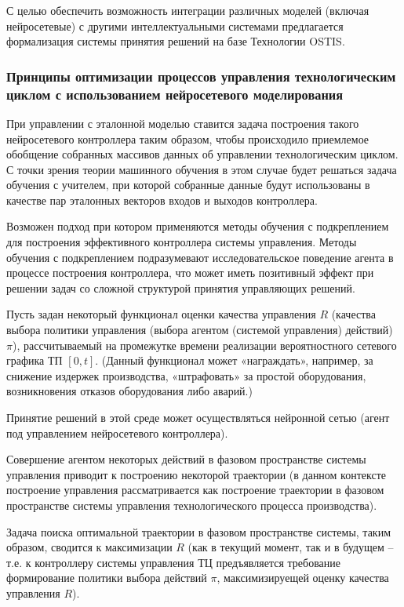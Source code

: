С целью обеспечить возможность интеграции различных моделей (включая нейросетевые) с другими интеллектуальными системами предлагается формализация системы принятия решений на базе Технологии OSTIS.










\subsubsection{Принципы оптимизации процессов управления технологическим циклом с использованием нейросетевого моделирования}

При управлении с эталонной моделью ставится задача построения такого нейросетевого контроллера таким образом, чтобы происходило приемлемое обобщение собранных массивов данных об управлении технологическим циклом. С точки зрения теории машинного обучения в этом случае будет решаться задача обучения с учителем, при которой собранные данные будут использованы в качестве пар эталонных векторов входов и выходов контроллера.

Возможен подход при котором применяются методы обучения с подкреплением для построения эффективного контроллера системы управления. Методы обучения с подкреплением подразумевают исследовательское поведение агента в процессе построения контроллера, что может иметь позитивный эффект при решении задач со сложной структурой принятия управляющих решений.

Пусть задан некоторый функционал оценки качества управления $R$ (качества выбора политики управления (выбора агентом (системой управления) действий) $\pi$), рассчитываемый на промежутке времени реализации вероятностного сетевого графика ТП $[0,t]$. (Данный функционал может «награждать», например, за снижение издержек производства, «штрафовать» за простой оборудования, возникновения отказов оборудования либо аварий.)

Принятие решений в этой среде может осуществляться нейронной сетью (агент под управлением нейросетевого контроллера).

Совершение агентом некоторых действий в фазовом пространстве системы управления приводит к построению некоторой траектории (в данном контексте построение управления рассматривается как построение траектории в фазовом пространстве системы управления технологического процесса производства).


Задача поиска оптимальной траектории в фазовом пространстве системы, таким образом, сводится к максимизации $R$ (как в текущий момент, так и в будущем – т.е. к контроллеру системы управления ТЦ предъявляется требование формирование политики выбора действий $\pi$, максимизируещей оценку качества управления $R$).

